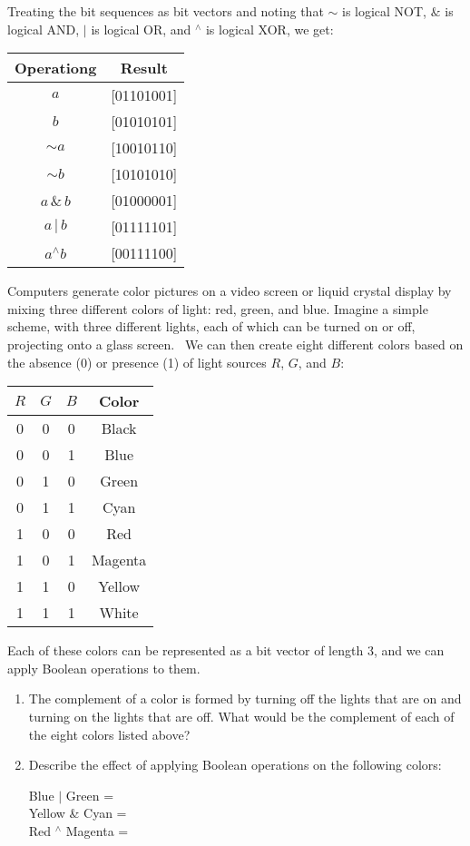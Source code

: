 \documentclass[12pt]{article}
\newenvironment{ex}[2][Exercise]{\begin{trivlist}
		\item[\hskip \labelsep {\bfseries #1}\hskip \labelsep {\bfseries #2.}]}{\end{trivlist}}
\newenvironment{sol}[1][Solution]{\begin{trivlist}
		\item[\hskip \labelsep {\bfseries #1:}]}{\end{trivlist}}
\begin{document}
\begin{sol}
	Treating the bit sequences as bit vectors and noting that $\sim$ is logical NOT,
	$\&$ is logical AND, $|$ is logical OR, and $^\wedge$ is logical XOR, we get:
	\begin{center}
		\begin{tabular}{cc}
			Operationg & Result\\
			\hline
			$a$ & [01101001]\\
			$b$ & [01010101]\\
			$\sim a$ & [10010110] \\
			$\sim b$ & [10101010] \\
			$a\, \& \,b$ & [01000001] \\
			$a \, | \, b$ & [01111101] \\
			$a ^\wedge b $ & [00111100]
		\end{tabular}
	\end{center}
\end{sol}

\begin{ex}{2.9}
	Computers generate color pictures on a video screen or liquid crystal display by
	mixing three different colors of light: red, green, and blue. Imagine a simple
	scheme, with three different lights, each of which can be turned on or off,
	projecting onto a glass screen.
	\
	We can then create eight different colors based on the absence (0) or presence (1)
	of light sources $R$, $G$, and $B$:
	\begin{center}
		\begin{tabular}{cccc}
			$R$ & $G$ & $B$ & Color\\
			\hline
			0 & 0 & 0 & Black\\
			0 & 0 & 1 & Blue \\
			0 & 1 & 0 & Green\\
			0 & 1 & 1 & Cyan \\
			1 & 0 & 0 & Red \\
			1 & 0 & 1 & Magenta\\
			1 & 1 & 0 & Yellow\\
			1 & 1 & 1 & White
		\end{tabular}
	\end{center}
	Each of these colors can be represented as a bit vector of length 3, and we can
	apply Boolean operations to them.
	\begin{enumerate}[label=(\alph*)]
		\item The complement of a color is formed by turning off the lights that are
		on and turning on the lights that are off. What would be the complement of
		each of the eight colors listed above?
		\item Describe the effect of applying Boolean operations on the following
		colors:
		\begin{center}
			Blue $|$ Green = \makebox[1cm]{\hrulefill} \\
			Yellow \& Cyan = \makebox[1cm]{\hrulefill} \\
			Red $^\wedge$ Magenta = \makebox[1cm]{\hrulefill} 
		\end{center}
	\end{enumerate}
\end{ex}
\end{document}
